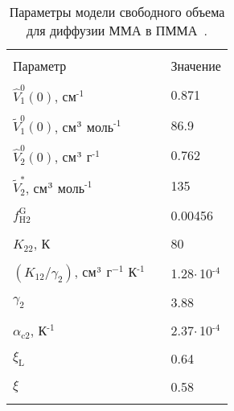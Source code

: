 \begin{table}[h]
	\centering
	\caption{Параметры модели свободного объема для диффузии ММА в ПММА~\cite{Tonge_free_volume_parameters}.}
	\begin{tabular}{l c l}
		\hline \hline \\ [-1em]
		Параметр & \hspace{4em} & Значение
		\\ \hline \\ [-1em]
		$\hat{V}_1^0(0)$, см$^\text{-1}$ & \hspace{1em} & 0.871
		\\ \\ [-1em]
		$\tilde{V}_1^0(0)$, см$^\text{3}$ моль$^\text{-1}$ & \hspace{1em} & 86.9
		\\ \\ [-1em]
		$\hat{V}_2^0(0)$, см$^\text{3}$ г$^\text{-1}$ & \hspace{1em} & 0.762
		\\ \\ [-1em]
		$\tilde{V}_2^*$, см$^\text{3}$ моль$^\text{-1}$ & \hspace{1em} & 135
		\\ \\ [-1em]
		$f_\mathrm{H2}^\mathrm{G}$ & \hspace{1em} & 0.00456
		\\ \\ [-1em]
		$K_{22}$, К & \hspace{1em} & 80
		\\ \\ [-1em]
		$(K_{12} / \gamma_2)$, см$^\text{3}$ г$^{-1}$ К$^\text{-1}$ & \hspace{1em} & 1.28\:$\cdot$\,10$^\text{-4}$
		\\ \\ [-1em]
		$\gamma_2$ & \hspace{1em} & 3.88
		\\ \\ [-1em]
		$\alpha_\mathrm{c2}$, К$^\text{-1}$ & \hspace{1em} & 2.37\:$\cdot$\,10$^\text{-4}$
		\\ \\ [-1em]
		$\xi_\mathrm{L}$ & \hspace{1em} & 0.64
		\\ \\ [-1em]
		$\xi$ & \hspace{1em} & 0.58
		\\ \\ [-1em]

\end{tabular}
\end{table}

